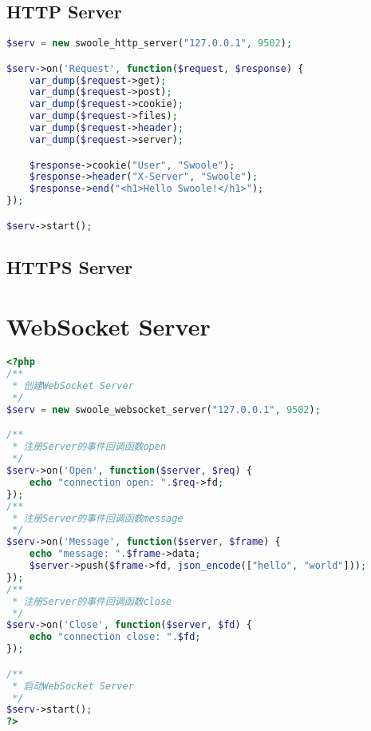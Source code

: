 \begin{lstlisting}[language=PHP]

\end{lstlisting}




\begin{lstlisting}[language=PHP]

\end{lstlisting}


\section{HTTP Server}


\begin{lstlisting}[language=PHP]
$serv = new swoole_http_server("127.0.0.1", 9502);

$serv->on('Request', function($request, $response) {
    var_dump($request->get);
    var_dump($request->post);
    var_dump($request->cookie);
    var_dump($request->files);
    var_dump($request->header);
    var_dump($request->server);

    $response->cookie("User", "Swoole");
    $response->header("X-Server", "Swoole");
    $response->end("<h1>Hello Swoole!</h1>");
});

$serv->start();
\end{lstlisting}


\section{HTTPS Server}





\chapter{WebSocket Server}


\begin{lstlisting}[language=PHP]
<?php
/**
 * 创建WebSocket Server
 */
$serv = new swoole_websocket_server("127.0.0.1", 9502);

/**
 * 注册Server的事件回调函数open
 */
$serv->on('Open', function($server, $req) {
    echo "connection open: ".$req->fd;
});
/**
 * 注册Server的事件回调函数message
 */
$serv->on('Message', function($server, $frame) {
    echo "message: ".$frame->data;
    $server->push($frame->fd, json_encode(["hello", "world"]));
});
/**
 * 注册Server的事件回调函数close
 */
$serv->on('Close', function($server, $fd) {
    echo "connection close: ".$fd;
});

/**
 * 启动WebSocket Server
 */
$serv->start();
?>
\end{lstlisting}

